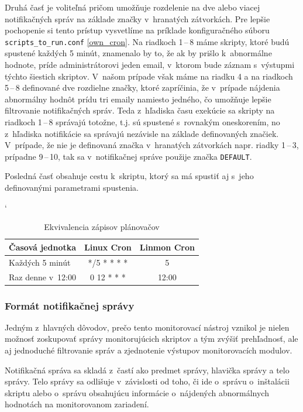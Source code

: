 Druhá časť je voliteľná pričom umožňuje rozdelenie na dve alebo viacej notifikačných správ  na základe značky v~hranatých zátvorkách. Pre lepšie pochopenie si tento prístup vysvetlíme na príklade konfiguračného súboru \texttt{scripts\_to\_run.conf} \ref{own_cron}. Na riadkoch 1\,--\,8 máme skripty, ktoré budú spustené každých 5 minút, znamenalo by to, že ak by prišlo k~abnormálne hodnote, príde administrátorovi jeden email, v~ktorom bude záznam  s~výstupmi týchto šiestich skriptov. V~našom prípade však máme na riadku 4 a na riadkoch 5\,--\,8 definované dve rozdielne značky, ktoré zapríčinia, že v~prípade nájdenia abnormálny hodnôt prídu tri emaily namiesto jedného, čo umožňuje lepšie filtrovanie notifikačných správ. Teda z~hľadiska času exekúcie sa skripty na riadkoch 1\,--\,8 správajú totožne, t.j. sú spustené s~rovnakým oneskorením, no z~hľadiska notifikácie sa správajú nezávisle na základe definovaných značiek. V~prípade, že nie je definovaná značka v~hranatých zátvorkách napr. riadky 1\,--\,3, prípadne 9\,--\,10, tak sa v~notifikačnej správe použije značka \texttt{DEFAULT}.

Posledná časť obsahuje cestu k~skriptu, ktorý sa má spustiť aj s~jeho definovanými parametrami spustenia.
\\
\begin{table}[h]
\catcode`
\begin{center}
\begin{tabular}{|l|c|c|}
	\hline
	\textbf{Časová jednotka} & \textbf{Linux Cron} & \textbf{Linmon Cron}\\
	\hline
	Každých 5 minút & */5 * * * *  & 5\\
	Raz denne v~12:00  & 0 12 * * * & 12:00\\
	\hline
\end{tabular}
\caption{Ekvivalencia zápisov plánovačov}
\label{cron_ekviv}
\end{center}
\end{table}

\subsubsection*{Formát notifikačnej správy}
Jedným z~hlavných dôvodov, prečo tento monitorovací nástroj vznikol je nielen možnosť zoskupovať správy monitorujúcich skriptov a tým zvýšiť prehľadnosť, ale aj jednoduché filtrovanie správ a  zjednotenie výstupov monitorovacích modulov.

Notifikačná správa sa skladá z~častí ako predmet správy, hlavička správy a telo správy. Telo správy sa odlišuje v~závislosti od toho, či ide o~správu o~inštalácii skriptu alebo o~správu obsahujúcu informácie o~nájdených abnormálnych hodnotách na monitorovanom zariadení. 


